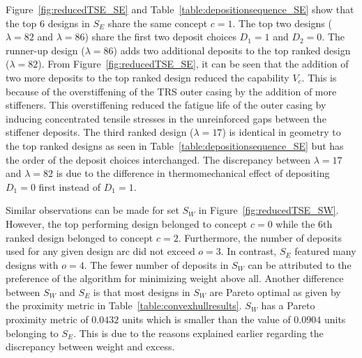Figure~\ref{fig:reducedTSE_SE} and Table~\ref{table:depositionsequence_SE} show that the top 6 designs in $S_E$ share the same concept $c=1$. The top two designs ($\lambda = 82$ and $\lambda = 86$) share the first two deposit choices $D_1=1$ and $D_2=0$. The runner-up design ($\lambda = 86$) adds two additional deposits to the top ranked design ($\lambda = 82$). From Figure~\ref{fig:reducedTSE_SE}, it can be seen that the addition of two more deposits to the top ranked design reduced the capability $V_c$. This is because of the overstiffening of the \ac{TRS} outer casing by the addition of more stiffeners. This overstiffening reduced the fatigue life of the outer casing by inducing concentrated tensile stresses in the unreinforced gaps between the stiffener deposits. The third ranked design ($\lambda = 17$) is identical in geometry to the top ranked designs as seen in Table~\ref{table:depositionsequence_SE} but has the order of the deposit choices interchanged. The discrepancy between $\lambda = 17$ and $\lambda = 82$ is due to the difference in thermomechanical effect of depositing $D_1=0$ first instead of $D_1=1$.

Similar observations can be made for set $S_W$ in Figure~\ref{fig:reducedTSE_SW}. However, the top performing design belonged to concept $c=0$ while the 6th ranked design belonged to concept $c=2$. Furthermore, the number of deposits used for any given design arc did not exceed $o=3$. In contrast, $S_E$ featured many designs with $o=4$. The fewer number of deposits in $S_W$ can be attributed to the preference of the algorithm for minimizing weight above all. Another difference between $S_W$ and $S_E$ is that most designs in $S_W$ are Pareto optimal as given by the proximity metric in Table~\ref{table:convexhullresults}. $S_W$ has a Pareto proximity metric of $0.0432$ units which is smaller than the value of $0.0904$ units belonging to $S_E$. This is due to the reasons explained earlier regarding the discrepancy between weight and excess.  


\renewcommand{\resultsCW}{1.7cm}
\newcommand{\dARA}{\texttt{[image: table\_E\_results/C1D1.pdf]}}
\newcommand{\dBRA}{\texttt{[image: table\_E\_results/C1D10.pdf]}}

